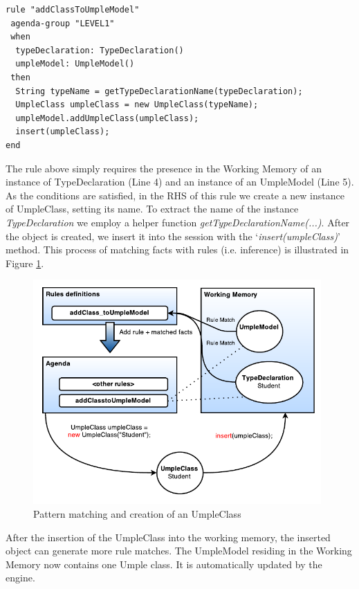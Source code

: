\begin{lstlisting}[language={drools},label={lst:addClassToUmpleModel}, caption=Rule 'addClassToUmpleModel']
rule "addClassToUmpleModel"
 agenda-group "LEVEL1" 
 when
  typeDeclaration: TypeDeclaration()
  umpleModel: UmpleModel()
 then
  String typeName = getTypeDeclarationName(typeDeclaration);
  UmpleClass umpleClass = new UmpleClass(typeName);
  umpleModel.addUmpleClass(umpleClass);
  insert(umpleClass);
end
\end{lstlisting}

The rule above simply requires the presence in the Working Memory of an instance of TypeDeclaration (Line 4) and an instance of an UmpleModel (Line 5). As the conditions are satisfied, in the RHS of this rule we create a new instance of UmpleClass, setting its name. To extract the name of the instance \textit{TypeDeclaration} we employ a helper function \textit{getTypeDeclarationName(...)}. After the object is created, we insert it into the session with the `\textit{insert(umpleClass)}' method. This process of matching facts with rules (i.e. inference) is illustrated in Figure \ref{fig:ruleModel}.

\begin{figure}[h]
\centering
\includegraphics[width=0.98\textwidth]{Figures/ruleModel.pdf}
\caption{Pattern matching and creation of an UmpleClass}
\label{fig:ruleModel}
\end{figure}

After the insertion of the UmpleClass into the working memory, the inserted object can generate more rule matches. The UmpleModel residing in the Working Memory now contains one Umple class. It is automatically updated by the engine.

